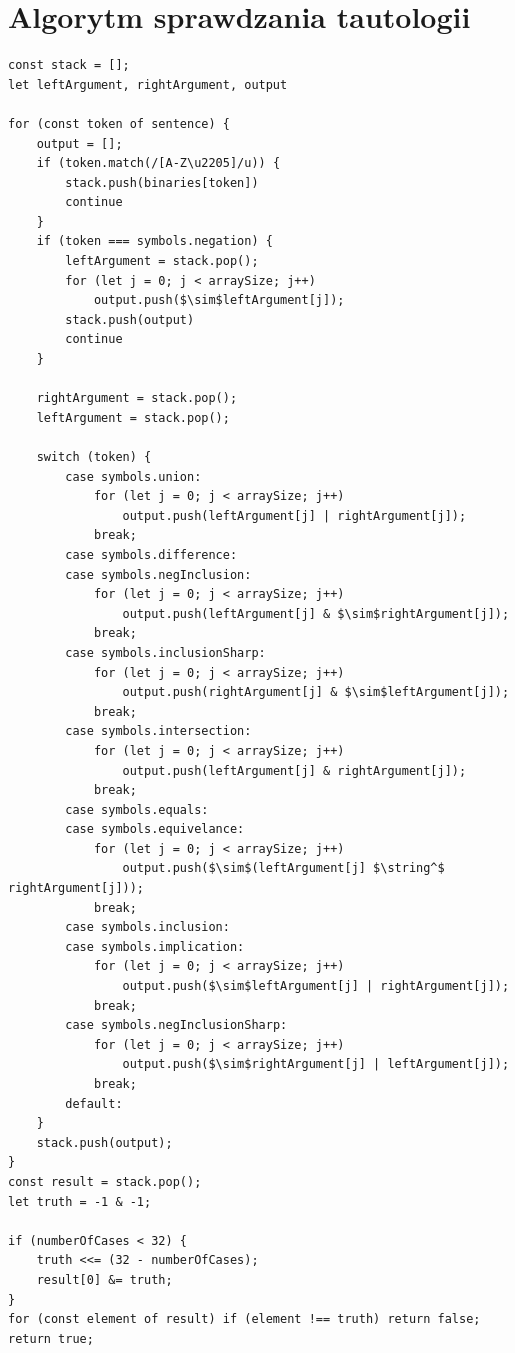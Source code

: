 \documentclass{SGGW-thesis}
\begin{document}
\section{Algorytm sprawdzania tautologii}

\begin{lstlisting}[style=JavaScript, caption={Kod dodający nawiasy do początkowego zdania}, mathescape=true]
const stack = [];
let leftArgument, rightArgument, output

for (const token of sentence) {
    output = [];
    if (token.match(/[A-Z\u2205]/u)) {
        stack.push(binaries[token])
        continue
    }
    if (token === symbols.negation) {
        leftArgument = stack.pop();
        for (let j = 0; j < arraySize; j++)
            output.push($\sim$leftArgument[j]);
        stack.push(output)
        continue
    }
    
    rightArgument = stack.pop();
    leftArgument = stack.pop();
    
    switch (token) {
        case symbols.union:
            for (let j = 0; j < arraySize; j++) 
                output.push(leftArgument[j] | rightArgument[j]);
            break;
        case symbols.difference:
        case symbols.negInclusion:
            for (let j = 0; j < arraySize; j++) 
                output.push(leftArgument[j] & $\sim$rightArgument[j]);
            break;
        case symbols.inclusionSharp:
            for (let j = 0; j < arraySize; j++) 
                output.push(rightArgument[j] & $\sim$leftArgument[j]);
            break;
        case symbols.intersection:
            for (let j = 0; j < arraySize; j++) 
                output.push(leftArgument[j] & rightArgument[j]);
            break;
        case symbols.equals:
        case symbols.equivelance:
            for (let j = 0; j < arraySize; j++)
                output.push($\sim$(leftArgument[j] $\string^$ rightArgument[j]));
            break;
        case symbols.inclusion:
        case symbols.implication:
            for (let j = 0; j < arraySize; j++) 
                output.push($\sim$leftArgument[j] | rightArgument[j]);
            break;
        case symbols.negInclusionSharp:
            for (let j = 0; j < arraySize; j++) 
                output.push($\sim$rightArgument[j] | leftArgument[j]);
            break;
        default:
    }
    stack.push(output);
}
const result = stack.pop();
let truth = -1 & -1;

if (numberOfCases < 32) {
    truth <<= (32 - numberOfCases);
    result[0] &= truth;
}
for (const element of result) if (element !== truth) return false;
return true;
\end{lstlisting}
\end{document}
